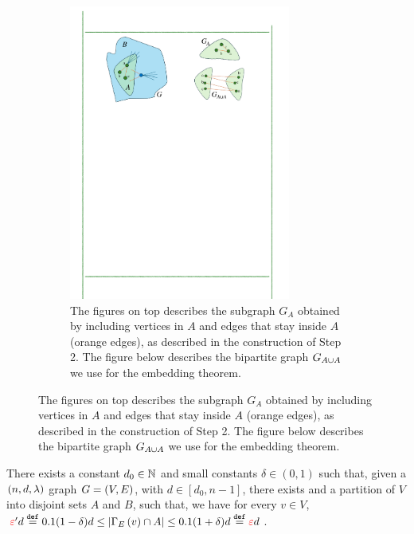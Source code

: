 \documentclass[11pt]{article}
\begin{document}
\begin{figure}[t!]
\begin{subfigure}[t]{0.45\textwidth}
        \includegraphics[width=0.8\textwidth]{assets/PartitionB.pdf}
        \caption{The figures on top describes the subgraph $G_A$ obtained by including vertices in $A$ and edges that stay inside $A$ (orange edges), as described in the construction of Step 2. The figure below describes the bipartite graph $G_{A \cup A}$ we use for the embedding theorem.}
        \label{subfig:partitionB}        
    \end{subfigure}
\end{figure}


\begin{theorem}\label{thm:partition}
There exists a constant $d_0 \in \mathbb{N}$ and small constants $\delta \in (0,1)$ such that, given a $(n, d, \lambda)$ graph $G = (V, E)$, with $d \in [d_0, n-1]$, there exists and a partition of $V$ into disjoint sets $A$ and $B$, such that, we have for every $v \in V$, $ \textcolor{red}{\varepsilon}'d \text{}\overset{\mathtt{def}}{=} 0.1(1-\delta)d\leq |\Gamma_{E}\left(v\right) \cap A| \leq 0.1(1+\delta)d \text{}\overset{\mathtt{def}}{=} \textcolor{red}{\varepsilon} d$. 
\end{theorem}
\end{document}
